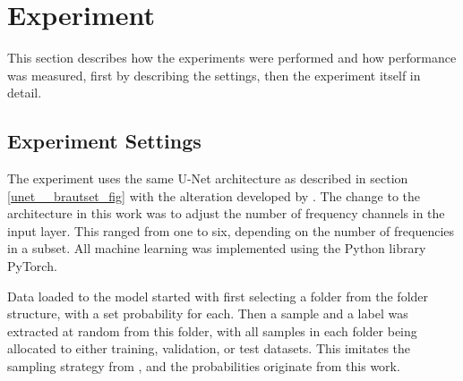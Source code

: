 \section{Experiment} \label{Experiment}
    This section describes how the experiments were performed and how performance was measured, first by describing the settings, then the experiment itself in detail.
    
    \subsection{Experiment Settings} \label{Experiment settings}
        The experiment uses the same U-Net architecture as described in section \ref{unet__brautset_fig} with the alteration developed by \citeauthor{brautaset2020acoustic}\cite{brautaset2020acoustic}. The change to the architecture in this work was to adjust the number of frequency channels in the input layer. This ranged from one to six, depending on the number of frequencies in a subset. All machine learning was implemented using the Python library PyTorch\cite{NEURIPS2019_9015}. %
        
        Data loaded to the model started with first selecting a folder from the folder structure, with a set probability for each. Then a sample and a label was extracted at random from this folder, with all samples in each folder being allocated to either training, validation, or test datasets. This imitates the sampling strategy from \citeauthor{brautaset2020acoustic}\cite{brautaset2020acoustic}, and the probabilities originate from this work.
        
